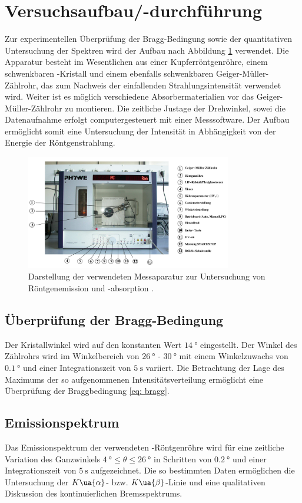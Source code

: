 \section{Versuchsaufbau/-durchführung}
Zur experimentellen Überprüfung der Bragg-Bedingung sowie der quantitativen Untersuchung der Spektren wird der Aufbau nach Abbildung
\ref{fig: aufbau} verwendet. Die Apparatur besteht im Wesentlichen aus einer Kupferröntgenröhre, einem schwenkbaren -Kristall
und einem ebenfalls schwenkbaren Geiger-Müller-Zählrohr, das zum Nachweis der einfallenden Strahlungsintensität verwendet wird.
Weiter ist es möglich verschiedene Absorbermaterialien vor das Geiger-Müller-Zählrohr
zu montieren. Die zeitliche Justage der Drehwinkel, sowei die Datenaufnahme erfolgt computergesteuert mit einer
Messsoftware. Der Aufbau ermöglicht somit eine Untersuchung der Intensität in Abhängigkeit von der Energie
der Röntgenstrahlung.
\begin{figure}
  \centering
  \includegraphics[width = 0.8\textwidth]{pics/aufbau.png}
  \caption{Darstellung der verwendeten Messaparatur zur Untersuchung von Röntgenemission und -absorption \cite{anleitung602}.}
  \label{fig: aufbau}
\end{figure}
\subsection{Überprüfung der Bragg-Bedingung}
Der Kristallwinkel wird auf den konstanten Wert $\SI{14}{\degree}$ eingestellt. Der Winkel des Zählrohrs wird im Winkelbereich
von $\SI{26}{\degree}$ - $\SI{30}{\degree}$ mit einem Winkelzuwachs von $\SI{0.1}{\degree}$ und einer Integrationszeit
von $\SI{5}{\second}$ variiert. Die Betrachtung der Lage des Maximums der so aufgenommenen Intensitätsverteilung ermöglicht eine Überprüfung
der Braggbedingung \ref{eq: bragg}.

\subsection{Emissionspektrum}
Das Emissionspektrum der verwendeten -Röntgenröhre wird für eine zeitliche Variation des Ganzwinkels
$\SI{4}{\degree} \leq \theta \leq \SI{26}{\degree}$ in Schritten von $\SI{0.2}{\degree}$ und einer Integrationszeit
von $\SI{5}{\second}$ aufgezeichnet. Die so bestimmten Daten ermöglichen die Untersuchung der $K\ua{\alpha}$- bzw.
$K\ua{\beta}$-Linie und eine qualitativen Diskussion des kontinuierlichen Bremsspektrums.

